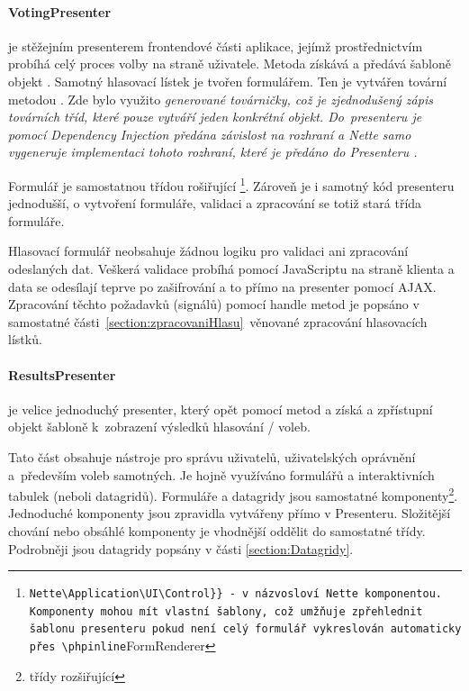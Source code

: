 \paragraph{VotingPresenter} je stěžejním presenterem frontendové části aplikace, jejímž prostřednictvím probíhá celý proces volby na straně uživatele. Metoda  získává a   předává šabloně objekt . Samotný hlasovací lístek je tvořen formulářem. Ten je vytvářen tovární metodou . Zde bylo využito \it{generované továrničky}, což je zjednodušený zápis továrních tříd, které pouze vytváří jeden konkrétní objekt. Do~presenteru je pomocí Dependency Injection předána závislost na rozhraní  a Nette samo vygeneruje implementaci tohoto rozhraní, které je předáno do Presenteru \cite{Planette}.

Formulář  je samostatnou třídou rošiřující \footnote{\Verb{Nette\Application\UI\Control}} - v názvosloví Nette komponentou. Komponenty mohou mít vlastní šablony, což umžňuje zpřehlednit šablonu presenteru pokud není celý formulář vykreslován automaticky přes \phpinline{FormRenderer}. Zároveň je i samotný kód presenteru jednodušší, o vytvoření formuláře, validaci a zpracování se totiž stará třída formuláře.

Hlasovací formulář neobsahuje žádnou logiku pro validaci ani zpracování odeslaných dat. Veškerá validace probíhá pomocí JavaScriptu na straně klienta a data se odesílají teprve po zašifrování a to přímo na presenter pomocí AJAX. Zpracování těchto požadavků (signálů) pomocí handle metod je popsáno v samostatné části~\ref{section:zpracovaniHlasu}~věnované zpracování hlasovacích lístků.


\paragraph{ResultsPresenter} je velice jednoduchý presenter, který opět pomocí metod  a  získá a zpřístupní objekt  šabloně k~zobrazení výsledků hlasování / voleb.


Tato část obsahuje nástroje pro správu uživatelů, uživatelských oprávnění a~především voleb samotných. Je hojně využíváno formulářů a interaktivních tabulek (neboli datagridů). Formuláře a datagridy jsou samostatné komponenty\footnote{třídy rozšiřující }. Jednoduché komponenty jsou zpravidla vytvářeny přímo v Presenteru. Složitější chování nebo obsáhlé komponenty je vhodnější oddělit do samostatné třídy. Podrobněji jsou datagridy popsány v části \ref{section:Datagridy}.

